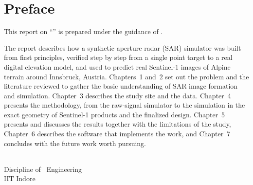 \chapter*{Preface}
\thispagestyle{plain}

This report on ``\btptitle'' is prepared under the guidance of \btpguide.

The report describes how a synthetic aperture radar (SAR) simulator was built from first principles, verified step
by step from a single point target to a real digital elevation model, and used to predict real Sentinel-1 images of
Alpine terrain around Innsbruck, Austria. Chapters~1 and~2 set out the problem and the literature reviewed to gather
the basic understanding of SAR image formation and simulation. Chapter~3 describes the study site and the data.
Chapter~4 presents the methodology, from the raw-signal simulator to the simulation in the exact geometry of
Sentinel-1 products and the finalized design. Chapter~5 presents and discusses the results together with the
limitations of the study, Chapter~6 describes the software that implements the work, and Chapter~7 concludes with the
future work worth pursuing.

\vspace{1.5cm}
\begin{flushright}
\btpstudents\\
Discipline of \btpdiscipline\ Engineering\\
IIT Indore
\end{flushright}
\cleardoublepage
